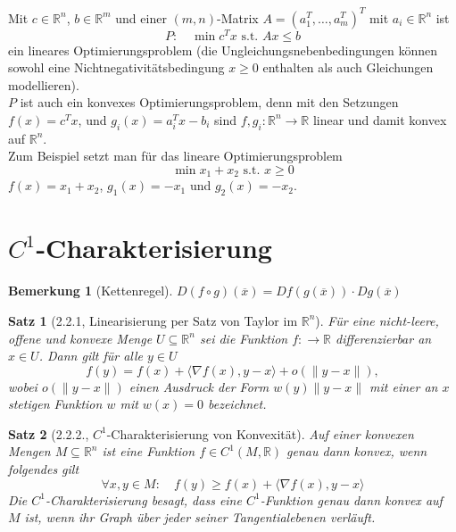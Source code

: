 \documentclass[12pt]{extreport} %
\newcommand{\R}{\mathbb{R}}
\theoremstyle{named}
\theoremstyle{nnamed}
\theoremstyle{itshape}
\newtheorem*{satz}{Satz}
\theoremstyle{normal}
\newtheorem*{bemerkung}{Bemerkung}
\begin{document}
\begin{beispiel}[2.1.10]
	Mit $c \in \R^n$, $b \in \R^m$ und einer $(m, n)$-Matrix $A = (a_1^T, \dotsc, a_m^T)^T$ mit $a_i \in \R^n$ ist
	$$ P: \quad \min c^T x \text{ s.t. } Ax \leq b $$
	ein lineares Optimierungsproblem (die Ungleichungsnebenbedingungen können sowohl eine Nichtnegativitätsbedingung $x \geq 0$ enthalten als auch Gleichungen modellieren). ~\\
	
	$P$ ist auch ein konvexes Optimierungsproblem, denn mit den Setzungen $f(x) = c^T x$, und $g_i(x) = a_i^T x - b_i$ sind $f, g_i \colon \R^n \rightarrow \R$ linear und damit konvex auf $\R^n$. ~\\
	
	Zum Beispiel setzt man für das lineare Optimierungsproblem
	$$ \min x_1 + x_2 \text{ s.t. } x \geq 0 $$
	$f(x) = x_1 + x_2$, $g_1(x) = - x_1$ und $g_2(x) = -x_2$.
\end{beispiel}

\newpage

\section{$C^1$-Charakterisierung}

\begin{bemerkung}[Kettenregel] $D(f \circ g)(\overline{x}) = D f(g(\overline{x})) \cdot D g(\overline{x})$	
\end{bemerkung}

\begin{satz}[2.2.1, Linearisierung per Satz von Taylor im $\R^n$]
	Für eine nicht-leere, offene und konvexe Menge $U \subseteq \R^n$ sei die Funktion $f \colon \rightarrow \R$ differenzierbar an $x \in U$. Dann gilt für alle $y \in U$	
	$$ f(y) = f(x) + \langle \nabla f(x), y - x \rangle + o \left( \| y - x \| \right), $$
	wobei $o \left( \| y - x \| \right)$ einen Ausdruck der Form $w(y) \| y - x \|$ mit einer an $x$ stetigen Funktion $w$ mit $w(x) = 0$ bezeichnet.
\end{satz}

\begin{satz}[2.2.2., $C^1$-Charakterisierung von Konvexität]
	Auf einer konvexen Mengen $M \subseteq \R^n$ ist eine Funktion $f \in C^1(M, \R)$	 genau dann konvex, wenn folgendes gilt
	$$ \forall x, y \in M: \quad f(y) \geq f(x) + \langle \nabla f(x), y - x \rangle $$
	Die $C^1$-Charakterisierung besagt, dass eine $C^1$-Funktion genau dann konvex auf $M$ ist, wenn ihr Graph über jeder seiner Tangentialebenen verläuft.
\end{satz}
\end{document}
